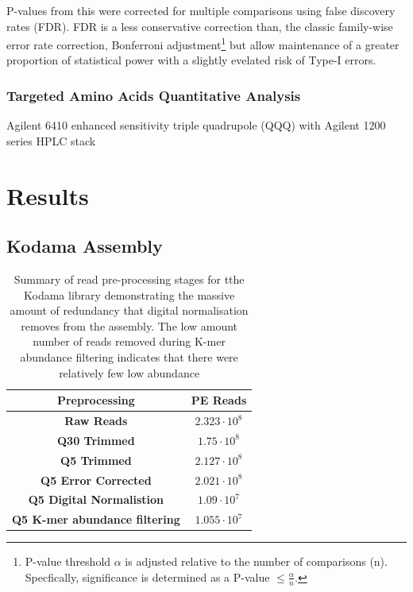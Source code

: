 P-values from this were corrected 
for multiple comparisons using false discovery rates (FDR).  FDR is a
less conservative correction than, the classic family-wise error rate correction,
Bonferroni adjustment\footnote{
    P-value threshold \(\alpha\) is adjusted relative to the number of comparisons (n). 
Specfically, significance is determined as a P-value \(\leq \frac{\alpha}{n}\).} but
allow maintenance of a greater proportion of statistical power with a 
slightly evelated risk of Type-I errors. 
%
%

%
%
\subsubsection{Targeted Amino Acids Quantitative Analysis}

Agilent 6410 enhanced sensitivity triple quadrupole (QQQ) 
with Agilent 1200 series HPLC stack





\section{Results}

\subsection{Kodama Assembly}

\begin{table}
    \begin{tabular}{|c|c|}
        \hline
        \textbf{Preprocessing} & \textbf{PE Reads} \\
        \hline
        \textbf{Raw Reads}  & \(2.323\cdot10^{8}\)\\
        \textbf{Q30 Trimmed} & \(1.75\cdot10^{8}\)\\
        \textbf{Q5 Trimmed}  & \(2.127\cdot10^{8} \) \\
        \textbf{Q5 Error Corrected}  & \(2.021\cdot10^{8}\)\\
        \textbf{Q5 Digital Normalistion} & \(1.09 \cdot10^{7}\)\\ 
        \textbf{Q5 K-mer abundance filtering} & \(1.055\cdot10^{7}\)\\
        \hline
    \end{tabular}
    \caption{Summary of read pre-processing stages for tthe Kodama library demonstrating
    the massive amount of redundancy that digital normalisation removes from the assembly.
The low amount number of reads removed during K-mer abundance filtering indicates
that there were relatively few low abundance 
}
    \label{tab:kodama_preproc}
\end{table}

